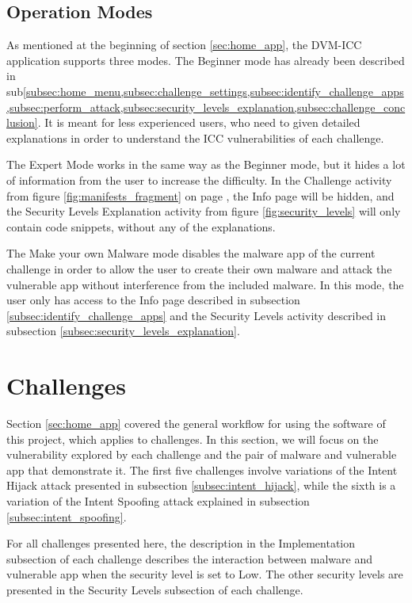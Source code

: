     \subsection{Operation Modes}
        \label{subsec:challenge_modes}
    
    As mentioned at the beginning of section \ref{sec:home_app}, the DVM-ICC application supports three modes. The Beginner mode has already been described in sub\cref{subsec:home_menu,subsec:challenge_settings,subsec:identify_challenge_apps,subsec:perform_attack,subsec:security_levels_explanation,subsec:challenge_conclusion}. It is meant for less experienced users, who need to given detailed explanations in order to understand the ICC vulnerabilities of each challenge.
    
    The Expert Mode works in the same way as the Beginner mode, but it hides a lot of information from the user to increase the difficulty. In the Challenge activity from figure \ref{fig:manifests_fragment} on page \pageref{fig:manifests_fragment}, the Info page will be hidden, and the Security Levels Explanation activity from figure \ref{fig:security_levels} will only contain code snippets, without any of the explanations.
    
    The Make your own Malware mode disables the malware app of the current challenge in order to allow the user to create their own malware and attack the vulnerable app without interference from the included malware. In this mode, the user only has access to the Info page described in subsection \ref{subsec:identify_challenge_apps} and the Security Levels activity described in subsection \ref{subsec:security_levels_explanation}.
    
    \section{Challenges}
        \label{sec:challenges}
        
    Section \ref{sec:home_app} covered the general workflow for using the software of this project, which applies to challenges. In this section, we will focus on the vulnerability explored by each challenge and the pair of malware and vulnerable app that demonstrate it. The first five challenges involve variations of the Intent Hijack attack presented in subsection \ref{subsec:intent_hijack}, while the sixth is a variation of the Intent Spoofing attack explained in subsection \ref{subsec:intent_spoofing}.
    
    For all challenges presented here, the description in the Implementation subsection of each challenge describes the interaction between malware and vulnerable app when the security level is set to Low. The other security levels are presented in the Security Levels subsection of each challenge.
    
